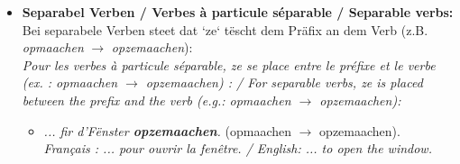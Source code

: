 \begin{itemize}
\begin{itemize}
    \end{itemize}
    \item \textbf{Separabel Verben / Verbes à particule séparable / Separable verbs:} Bei separabele Verben steet dat `ze` tëscht dem Präfix an dem Verb (z.B. \textit{opmaachen} $\rightarrow$ \textit{opzemaachen}): \\
    \textit{Pour les verbes à particule séparable, ze se place entre le préfixe et le verbe (ex. : opmaachen $\rightarrow$ opzemaachen) : / For separable verbs, ze is placed between the prefix and the verb (e.g.: opmaachen $\rightarrow$ opzemaachen):}
    \begin{itemize}
        \item \textit{... fir d'Fënster \textbf{opzemaachen}.} (opmaachen $\rightarrow$ opzemaachen). \\
        \textit{Français : ... pour ouvrir la fenêtre. / English: ... to open the window.}
    \end{itemize}
\end{itemize}

